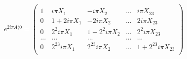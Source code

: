 \begin{equation}
\label{eq:expA(0)z=1}
e^{2i\pi A(0}=\left(\begin{array}{ccccc}\\
1&i\pi X_1&-i\pi X_2 & ...& i\pi X_{23}\\
0&1+2i\pi X_1 & -2i\pi X_2 & ... & 2i\pi X_{23} \\
0&2^2i\pi X_1 & 1 - 2^2i\pi X_2 & ...& 2^2i\pi X_{23} \\
...&...&...&...&...\\
0&2^{23}i\pi X_1&2^{23}i\pi X_2&...&1+2^{23}i\pi X_{23}\\
\end{array}\right)
\end{equation}

